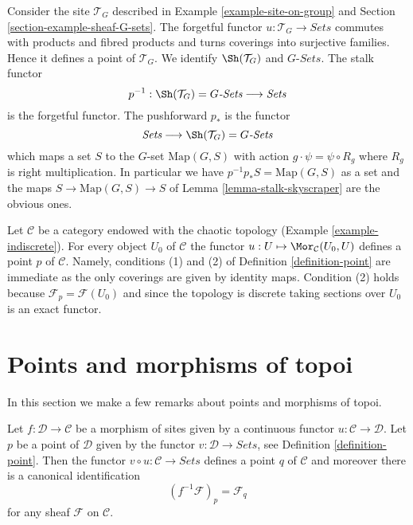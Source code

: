 \begin{example}
\label{example-point-G-sets}
Consider the site $\mathcal{T}_G$ described in
Example \ref{example-site-on-group} and
Section \ref{section-example-sheaf-G-sets}.
The forgetful functor $u : \mathcal{T}_G \to \textit{Sets}$
commutes with products and fibred products and turns
coverings into surjective families. Hence it defines a point
of $\mathcal{T}_G$. We identify $\Sh(\mathcal{T}_G)$
and $G\textit{-Sets}$. The stalk functor
$$
p^{-1} :
\Sh(\mathcal{T}_G) = G\textit{-Sets}
\longrightarrow
\textit{Sets}
$$
is the forgetful functor. The pushforward $p_*$ is the
functor
$$
\textit{Sets}
\longrightarrow
\Sh(\mathcal{T}_G) = G\textit{-Sets}
$$
which maps a set $S$ to the $G$-set $\text{Map}(G, S)$ with
action $g \cdot \psi = \psi \circ R_g$ where $R_g$ is right
multiplication. In particular we have
$p^{-1}p_*S = \text{Map}(G, S)$ as a set and the maps
$S \to \text{Map}(G, S) \to S$ of
Lemma \ref{lemma-stalk-skyscraper}
are the obvious ones.
\end{example}

\begin{example}
\label{example-indiscrete-points}
Let $\mathcal{C}$ be a category endowed with the chaotic topology
(Example \ref{example-indiscrete}). For every object $U_0$ of $\mathcal{C}$
the functor $u : U \mapsto \Mor_\mathcal{C}(U_0, U)$ defines a point
$p$ of $\mathcal{C}$. Namely, conditions (1) and (2) of
Definition \ref{definition-point} are immediate as the only coverings
are given by identity maps. Condition (2) holds because
$\mathcal{F}_p = \mathcal{F}(U_0)$ and since the topology is discrete
taking sections over $U_0$ is an exact functor.
\end{example}





\section{Points and morphisms of topoi}
\label{section-functorial-points}

\noindent
In this section we make a few remarks about points and morphisms
of topoi.

\begin{lemma}
\label{lemma-point-morphism-sites}
Let $f : \mathcal{D} \to \mathcal{C}$ be a morphism of sites
given by a continuous functor $u : \mathcal{C} \to \mathcal{D}$.
Let $p$ be a point of $\mathcal{D}$ given by the functor
$v : \mathcal{D} \to \textit{Sets}$, see
Definition \ref{definition-point}.
Then the functor $v \circ u : \mathcal{C} \to \textit{Sets}$
defines a point $q$ of $\mathcal{C}$ and moreover there is
a canonical identification
$$
(f^{-1}\mathcal{F})_p = \mathcal{F}_q
$$
for any sheaf $\mathcal{F}$ on $\mathcal{C}$.
\end{lemma}

